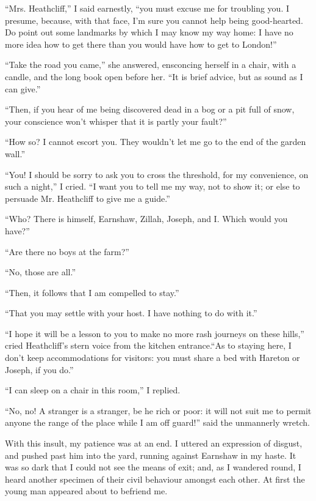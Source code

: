 \par “Mrs. Heathcliff,” I said earnestly, “you must excuse me for troubling you. I presume, because, with that face, I'm sure you cannot help being good-hearted. Do point out some landmarks by which I may know my way home: I have no more idea how to get there than you would have how to get to London!”
\par “Take the road you came,” she answered, ensconcing herself in a chair, with a candle, and the long book open before her. “It is brief advice, but as sound as I can give.”
\par “Then, if you hear of me being discovered dead in a bog or a pit full of snow, your conscience won't whisper that it is partly your fault?”
\par “How so? I cannot escort you. They wouldn't let me go to the end of the garden wall.”
\par “You! I should be sorry to ask you to cross the threshold, for my convenience, on such a night,” I cried. “I want you to tell me my way, not to show it; or else to persuade Mr. Heathcliff to give me a guide.”
\par “Who? There is himself, Earnshaw, Zillah, Joseph, and I. Which would you have?”
\par “Are there no boys at the farm?”
\par “No, those are all.”
\par “Then, it follows that I am compelled to stay.”
\par “That you may settle with your host. I have nothing to do with it.”
\par “I hope it will be a lesson to you to make no more rash journeys on these hills,” cried Heathcliff's stern voice from the kitchen entrance.“As to staying here, I don't keep accommodations for visitors: you must share a bed with Hareton or Joseph, if you do.”
\par “I can sleep on a chair in this room,” I replied.
\par “No, no! A stranger is a stranger, be he rich or poor: it will not suit me to permit anyone the range of the place while I am off guard!” said the unmannerly wretch.
\par With this insult, my patience was at an end. I uttered an expression of disgust, and pushed past him into the yard, running against Earnshaw in my haste. It was so dark that I could not see the means of exit; and, as I wandered round, I heard another specimen of their civil behaviour amongst each other. At first the young man appeared about to befriend me.
